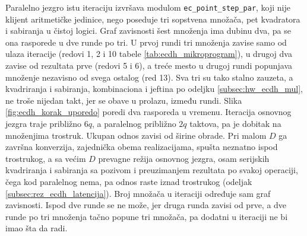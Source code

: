 Paralelno jezgro istu iteraciju izvršava modulom \texttt{ec\_point\_step\_par}, koji nije klijent aritmetičke jedinice, nego poseduje tri sopstvena množača, pet kvadratora i sabiranja u čistoj logici. Graf zavisnosti šest množenja ima dubinu dva, pa se ona rasporede u dve runde po tri. U prvoj rundi tri množenja zavise samo od ulaza iteracije (redovi 1, 2 i 10 tabele \ref{tab:ecdh_mikroprogram}), u drugoj dva zavise od rezultata prve (redovi 5 i 6), a treće mesto u drugoj rundi popunjava množenje nezavisno od svega ostalog (red 13). Sva tri su tako stalno zauzeta, a kvadriranja i sabiranja, kombinaciona i jeftina po odeljku \ref{subsec:hw_ecdh_mul}, ne troše nijedan takt, jer se obave u prolazu, između rundi.
\smallbreak
Slika \ref{fig:ecdh_korak_uporedo} poredi dva rasporeda u vremenu. Iteracija osnovnog jezgra traje približno $6q$, a paralelnog približno $2q$ taktova, pa je dobitak na množenjima trostruk. Ukupan odnos zavisi od širine obrade. Pri malom $D$ ga završna konverzija, zajednička obema realizacijama, spušta neznatno ispod trostrukog, a sa većim $D$ prevagne režija osnovnog jezgra, osam serijskih kvadriranja i sabiranja sa pozivom i preuzimanjem rezultata po svakoj operaciji, čega kod paralelnog nema, pa odnos raste iznad trostrukog (odeljak \ref{subsec:rez_ecdh_latencija}). Broj množača u iteraciji određuje sam graf zavisnosti. Ispod dve runde se ne može, jer druga runda zavisi od prve, a dve runde po tri množenja tačno popune tri množača, pa dodatni u iteraciji ne bi imao šta da radi.

